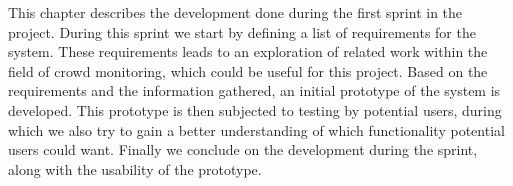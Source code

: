 This chapter describes the development done during the first sprint in the project. During this sprint we start by defining a list of requirements for the system. These requirements leads to an exploration of related work within the field of crowd monitoring, which could be useful for this project. Based on the requirements and the information gathered, an initial prototype of the system is developed. This prototype is then subjected to testing by potential users, during which we also try to gain a better understanding of which functionality potential users could want. Finally we conclude on the development during the sprint, along with the usability of the prototype.


